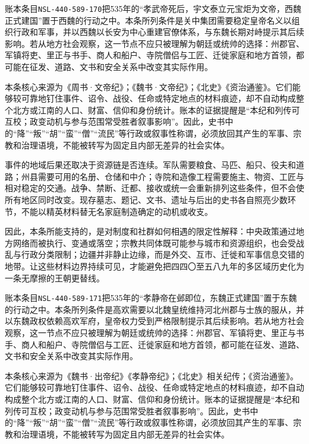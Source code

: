 账本条目\texttt{NSL-440-589-170}把535年的“孝武帝死后，宇文泰立元宝炬为文帝，西魏正式建国”置于西魏的行动之中。本条所列条件是关中集团需要稳定皇帝名义以组织行政和军事，并以西魏以长安为中心重建官僚体系，与东魏长期对峙提示其后续影响。若从地方社会观察，这一节点不应只被理解为朝廷或统帅的选择：州郡官、军镇将吏、里正与书手、商人和船户、寺院僧侣与工匠、迁徙家庭和地方首领，都可能在征发、道路、文书和安全关系中改变其实际作用。

本条核心来源为《周书·文帝纪》；《魏书·文帝纪》；《北史》《资治通鉴》。它们能够较可靠地钉住事件、诏令、战役、任命或特定地点的材料痕迹，却不自动构成整个北方或江南的人口、财富、信仰和身份统计。账本的证据提醒是“本纪和列传可互校；政变动机与参与范围常受胜者叙事影响”。因此，史书中的“降”“叛”“胡”“蛮”“僧”“流民”等行政或叙事性称谓，必须放回其产生的军事、宗教和治理语境，不能被转写为固定且内部无差异的社会实体。

事件的地域后果还取决于资源链是否连续。军队需要粮食、马匹、船只、役夫和道路；州县需要可用的名册、仓储和中介；寺院和造像工程需要施主、物资、工匠与相对稳定的交通。战争、禁断、迁都、接收或统一会重新排列这些条件，但不会使所有地区同时改变。现存墓志、题记、文书、遗址与后出的史书各自照亮少数环节，不能以精英材料替无名家庭制造确定的动机或收支。

因此，本条所能支持的，是对制度和社群如何相遇的限定性解释：中央政策通过地方网络而被执行、变通或落空；宗教共同体既可能参与城市和资源组织，也会受战乱与行政分类限制；边疆并非静止边缘，而是外交、互市、迁徙和军事信息交错的地带。让这些材料边界持续可见，才能避免把四四〇至五八九年的多区域历史化为一条无摩擦的王朝更替线。

账本条目\texttt{NSL-440-589-171}把535年的“孝静帝在邺即位，东魏正式建国”置于东魏的行动之中。本条所列条件是高欢需要以北魏皇统维持河北州郡与士族的服从，并以东魏政权依赖高欢军府，皇帝权力受到严格限制提示其后续影响。若从地方社会观察，这一节点不应只被理解为朝廷或统帅的选择：州郡官、军镇将吏、里正与书手、商人和船户、寺院僧侣与工匠、迁徙家庭和地方首领，都可能在征发、道路、文书和安全关系中改变其实际作用。

本条核心来源为《魏书·出帝纪》《孝静帝纪》；《北史》相关纪传；《资治通鉴》。它们能够较可靠地钉住事件、诏令、战役、任命或特定地点的材料痕迹，却不自动构成整个北方或江南的人口、财富、信仰和身份统计。账本的证据提醒是“本纪和列传可互校；政变动机与参与范围常受胜者叙事影响”。因此，史书中的“降”“叛”“胡”“蛮”“僧”“流民”等行政或叙事性称谓，必须放回其产生的军事、宗教和治理语境，不能被转写为固定且内部无差异的社会实体。

